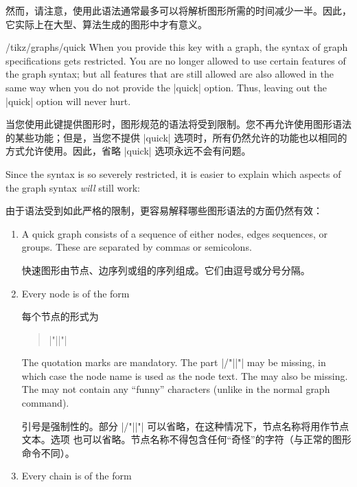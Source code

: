 然而，请注意，使用此语法通常最多可以将解析图形所需的时间减少一半。因此，它实际上在大型、算法生成的图形中才有意义。

\begin{key}{/tikz/graphs/quick}
    When you provide this key with a graph, the syntax of graph specifications
    gets restricted. You are no longer allowed to use certain features of the
    graph syntax; but all features that are still allowed are also allowed in
    the same way when you do not provide the |quick| option. Thus, leaving out
    the |quick| option will never hurt.

    当您使用此键提供图形时，图形规范的语法将受到限制。您不再允许使用图形语法的某些功能；但是，当您不提供 |quick| 选项时，所有仍然允许的功能也以相同的方式允许使用。因此，省略 |quick| 选项永远不会有问题。

    Since the syntax is so severely restricted, it is easier to explain which
    aspects of the graph syntax \emph{will} still work:
    
    由于语法受到如此严格的限制，更容易解释哪些图形语法的方面仍然有效：
    \begin{enumerate}
        \item A quick graph consists of a sequence of either nodes, edges
            sequences, or groups. These are separated by commas or semicolons.

            快速图形由节点、边序列或组的序列组成。它们由逗号或分号分隔。
        \item Every node is of the form

        每个节点的形式为
            \begin{quote}
                |"||"|
            \end{quote}

            The quotation marks are mandatory. The part |/"||"|
            may  be missing, in which case the node name is used as the node
            text. The  may also be missing. The 
            may not contain any ``funny'' characters (unlike in the normal
            graph command).

            引号是强制性的。部分 |/"||"| 可以省略，在这种情况下，节点名称将用作节点文本。选项  也可以省略。节点名称不得包含任何``奇怪''的字符（与正常的图形命令不同）。

        \item Every chain is of the form


\end{enumerate}
\end{key}
